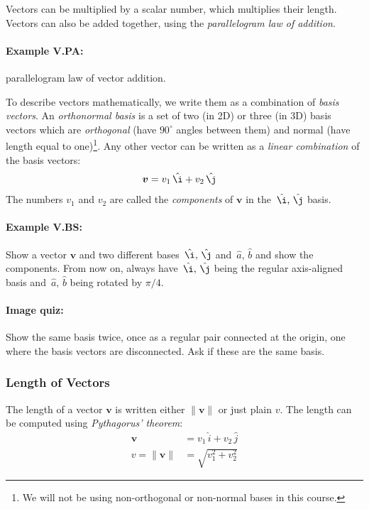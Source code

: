 \documentclass{article}
\renewcommand{\vec}[1]{\boldsymbol{#1}}
\newcommand{\unit}[1]{\,\hat{#1}}
\begin{document}
Vectors can be multiplied by a scalar number, which multiplies their
length. Vectors can also be added together, using the
\emph{parallelogram law of addition}.

\paragraph{Example V.PA:} parallelogram law of vector addition.

To describe vectors mathematically, we write them as a combination of
\emph{basis vectors}. An \emph{orthonormal basis} is a set of two (in
2D) or three (in 3D) basis vectors which are \emph{orthogonal} (have
$90^\circ$ angles between them) and {normal} (have length equal to
one)\footnote{We will not be using non-orthogonal or non-normal bases
  in this course.}. Any other vector can be written as a \emph{linear
  combination} of the basis vectors:
\begin{align}
  \vec{v} &= v_1 \unit{\i} + v_2 \unit{\j}
\end{align}
The numbers $v_1$ and $v_2$ are called the \emph{components} of
$\vec{v}$ in the $\unit{\i}, \unit{\j}$ basis.

\paragraph{Example V.BS:} Show a vector $\vec{v}$ and two different bases
$\unit{\i}, \unit{\j}$ and $\unit{a}, \unit{b}$ and show the components. From
now on, always have $\unit{\i}, \unit{\j}$ being the regular axis-aligned
basis and $\unit{a}, \unit{b}$ being rotated by $\pi/4$.

\paragraph{Image quiz:} Show the same basis twice, once as a regular
pair connected at the origin, one where the basis vectors are
disconnected. Ask if these are the same basis.

\subsubsection{Length of Vectors}

The length of a vector $\vec{v}$ is written either $\|\vec{v}\|$ or
just plain $v$. The length can be computed using \emph{Pythagorus'
  theorem}:
\begin{align}
  \vec{v} &= v_1 \unit{i} + v_2 \unit{j} \\
  v = \|\vec{v}\| &= \sqrt{v_1^2 + v_2^2}
\end{align}
\end{document}

